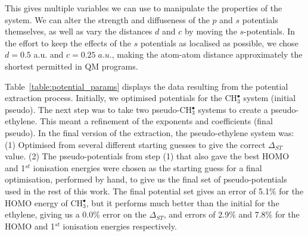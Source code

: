 \documentclass[12pt]{article}
\begin{document}
This gives multiple variables we can use to manipulate the properties of the system.
We can alter the strength and diffuseness of the \(p\) and \(s\) potentials themselves,
as well as vary the distances \(d\) and \(c\) by moving the \(s\)-potentials.
In the effort to keep the effects 
of the $s$ potentials as localised as possible, we chose $d=0.5$ a.u. and \(c = 0.25\;a.u.\), making the atom-atom distance approximately the shortest permitted in QM programs.

Table~\ref{table:potential_params} displays the data resulting from the potential extraction process. 
Initially, we optimised potentials for the CH$_3^\bullet$ system (initial pseudo).
The next step was to take two pseudo-CH\(^{\bullet}_{3}\) systems to create a pseudo-ethylene. 
This meant a refinement of the exponents and coefficients (final pseudo).
In the final version of the extraction, the pseudo-ethylene system was: (1) Optimised from several different starting guesses to give the correct $\Delta_{ST}$ value. (2) The pseudo-potentials from step (1) that also gave the best HOMO and 1$^{st}$ ionisation energies were chosen as the starting guess for a final optimisation, performed by hand, to give us the final set of pseudo-potentials used in the rest of this work.
The final potential set gives an error of 5.1\% for the HOMO energy of CH\(^{\bullet}_{3}\), but it
performs much better than the initial for the ethylene,
giving us a 0.0\% error on the $\Delta_{ST}$, and errors of 2.9\% and 7.8\% for the HOMO and 1$^{st}$ ionisation energies respectively.
\end{document}
